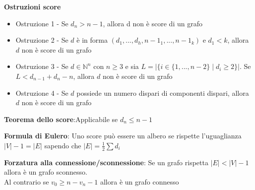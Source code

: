 \documentclass[12pt, a4paper]{article}
\begin{document}
\textbf{Ostruzioni score}
\begin{itemize}
    \item Ostruzione 1 - Se $d_{n} > n-1$, allora d non è score di un grafo
    \item Ostruzione 2 - Se $d$ è in forma $(d_{1},...,d_{h},n-1_{1},...,n-1_{k})$ e $d_{1}<k$, allora 
    $d$ non è score di un grafo
    \item Ostruzione 3 - Se $d\in\mathbb{N}^{n}$ con $n\geq 3$ e sia $L=|\{i\in\{1,...,n-2\}\mid
    d_{i}\geq 2\}|$. Se $L<d_{n-1}+d_{n}-n$, allora $d$ non è score di un grafo
    \item Ostruzione 4 - Se $d$ possiede un numero dispari di componenti dispari, allora $d$ non è score
    di un grafo
\end{itemize}
\textbf{Teorema dello score}:Applicabile se $d_{n}\leq n-1$

\textbf{Formula di Eulero}: Uno score può essere un albero se rispette l'uguaglianza $|V|-1=|E|$ sapendo
che $|E|=\frac{1}{2}\sum d_{i}$

\textbf{Forzatura alla connessione/sconnessione}: Se un grafo rispetta $|E|<|V|-1$ allora è un grafo 
sconnesso.\\Al contrario se $v_{0}\geq n - v_{n} -1$ allora è un grafo connesso
\end{document}
